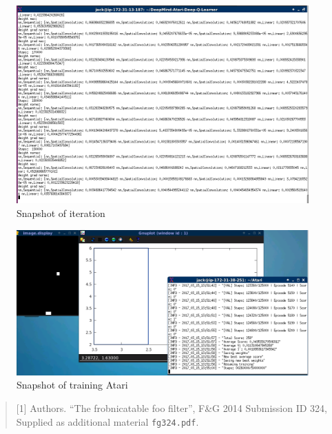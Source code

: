 \documentclass[10pt,twocolumn,letterpaper]{article}
\begin{document}
\begin{figure}[H]
	\begin{center}
		\includegraphics[width=0.8\linewidth]{img/fig2.png}
	\end{center}
	\caption{Snapshot of iteration}
	\label{fig:long}
	\label{fig:onecol}
\end{figure}
\begin{figure}[H]
	\begin{center}
		\includegraphics[width=0.8\linewidth]{img/fig3.png}
	\end{center}
	\caption{Snapshot of training  Atari}
	\label{fig:long}
	\label{fig:onecol}
\end{figure}


\begin{quote}
[1] Authors. ``The frobnicatable foo filter'', F\&G 2014 Submission ID 324,
Supplied as additional material {\tt fg324.pdf}.
\end{quote}
\end{document}
